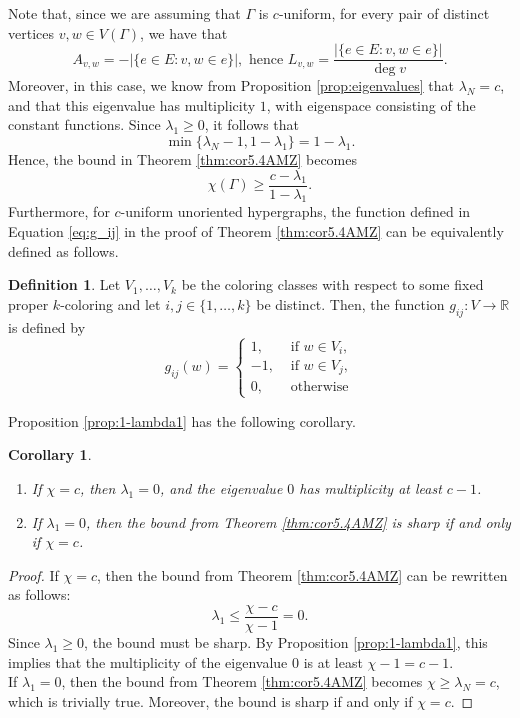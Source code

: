 \documentclass{article}
\newcommand{\R}{\mathbb{R}}
\theoremstyle{plain}
\newtheorem{corollary}[theorem]{Corollary}
\theoremstyle{definition}
\newtheorem{definition}[theorem]{Definition}
\theoremstyle{remark}
\begin{document}
Note that, since we are assuming that $\Gamma$ is $c$-uniform, for every pair of distinct vertices $v,w\in V(\Gamma)$, we have that
\[
A_{v,w} = -\bigl| \{ e\in E \colon v,w\in e\}\bigr|, \text{ hence } L_{v,w} = \frac{\bigl| \{ e\in E \colon v,w\in e\}\bigr|}{\deg v}.
\]
Moreover, in this case, we know from Proposition \ref{prop:eigenvalues} that $\lambda_N = c$, and that this eigenvalue has multiplicity $1$, with eigenspace consisting of the constant functions.
Since $\lambda_1\geq 0$, it follows that
\[
\min\bigl\{\lambda_N-1,1-\lambda_1\bigr\} = 1-\lambda_1.
\]
Hence, the bound in Theorem \ref{thm:cor5.4AMZ} becomes
\[
\chi(\Gamma)\geq \frac{c-\lambda_1}{1-\lambda_1}.
\]
Furthermore, for $c$-uniform unoriented hypergraphs, the function defined in Equation \eqref{eq:g_ij} in the proof of Theorem \ref{thm:cor5.4AMZ} can be equivalently defined as follows.
\begin{definition}\label{def:gij}
    Let $V_1,\ldots,V_k$ be the coloring classes with respect to some fixed proper $k$-coloring and let $i,j\in \{1,\ldots,k\}$ be distinct. Then, the function $g_{ij}\colon V\to \R$ is defined by
    \[
    g_{ij}(w) = \begin{cases}
        1, &\text{ if }w\in V_i,\\
        -1, &\text{ if }w\in V_j,\\
        0, &\text{ otherwise}
    \end{cases}
    \]
\end{definition}
Proposition \ref{prop:1-lambda1} has the following corollary.

\begin{corollary}\label{cor:chi=c}

\begin{enumerate}
    \item  If $\chi=c$, then $\lambda_1=0$, and the eigenvalue $0$ has multiplicity at least $c-1$.
    \item If $\lambda_1=0$, then the bound from Theorem \ref{thm:cor5.4AMZ} is sharp if and only if $\chi=c$.
\end{enumerate}
\end{corollary}


\begin{proof} If $\chi=c$, then the bound from Theorem \ref{thm:cor5.4AMZ} can be rewritten as follows:
    \[
    \lambda_1\leq \frac{\chi-c}{\chi-1} = 0.
    \]
    Since $\lambda_1\geq0$, the bound must be sharp. By Proposition \ref{prop:1-lambda1}, this implies that the multiplicity of the eigenvalue $0$ is at least $\chi-1=c-1$.\\

  If $\lambda_1=0$, then the bound from Theorem \ref{thm:cor5.4AMZ} becomes $\chi \geq \lambda_N=c$, which is trivially true. Moreover, the bound is sharp if and only if $\chi=c$.

\end{proof}
\end{document}
